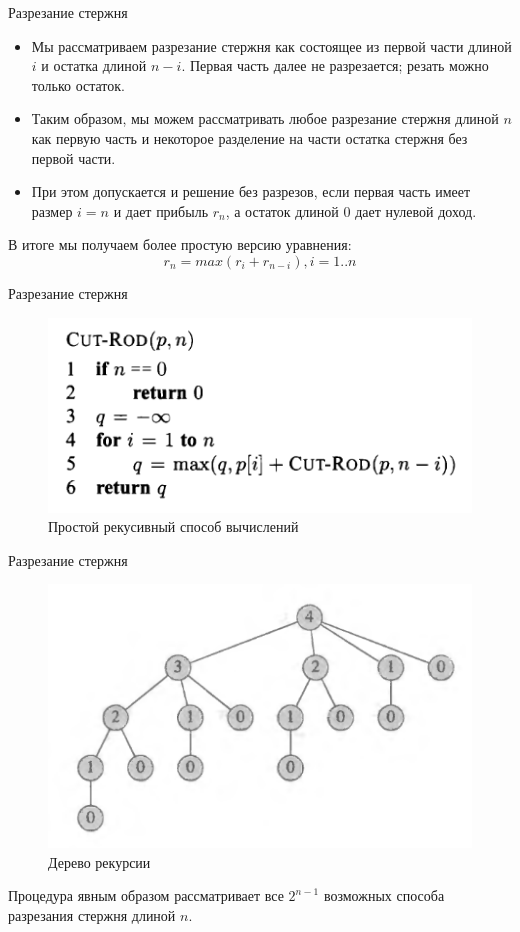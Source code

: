 \documentclass{beamer}
\begin{document}
\begin{frame}[t]{Разрезание стержня}
    \begin{itemize}
        \item Мы рассматриваем разрезание стержня как состоящее из первой части длиной $i$ и остатка длиной $n-i$. Первая часть далее не разрезается; резать можно только остаток. 
        
        \item Таким образом, мы можем рассматривать любое разрезание стержня длиной $n$ как первую часть и некоторое разделение на части остатка стержня без первой части. 
    
        \item При этом допускается и решение без разрезов, если первая часть имеет размер $i=n$ и дает прибыль $r_n$, а остаток длиной $0$ дает нулевой доход. 
    \end{itemize}
    
    В итоге мы получаем более простую версию уравнения:
    \[r_n=max(r_i+r_{n-i}), i=1..n\]
\end{frame}

\begin{frame}[t]{Разрезание стержня}
    \begin{figure}[h]
		\centering
		\includegraphics[scale=1.0]{images/lec09-pic04.png}
		\caption{Простой рекусивный способ вычислений}
	\end{figure}
\end{frame}

\begin{frame}[t]{Разрезание стержня}
    \begin{figure}[h]
		\centering
		\includegraphics[scale=0.7]{images/lec09-pic05.png}
		\caption{Дерево рекурсии}
	\end{figure}
	
	Процедура явным образом рассматривает все $2^{n-1}$ возможных способа разрезания стержня длиной $n$.
\end{frame}
\end{document}
